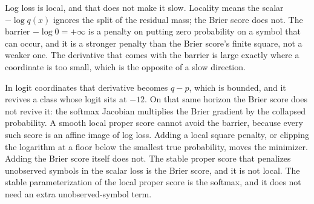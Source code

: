 \documentclass[10pt]{article}
\begin{document}
Log loss is local, and that does not make it slow.
Locality means the scalar $-\log q(x)$ ignores the split of the residual mass; the Brier score does not.
The barrier $-\log 0=+\infty$ is a penalty on putting zero probability on a symbol that can occur, and it is a stronger penalty than the Brier score's finite square, not a weaker one.
The derivative that comes with the barrier is large exactly where a coordinate is too small, which is the opposite of a slow direction.

In logit coordinates that derivative becomes $q-p$, which is bounded, and it revives a class whose logit sits at $-12$.
On that same horizon the Brier score does not revive it: the softmax Jacobian multiplies the Brier gradient by the collapsed probability.
A smooth local proper score cannot avoid the barrier, because every such score is an affine image of log loss.
Adding a local square penalty, or clipping the logarithm at a floor below the smallest true probability, moves the minimizer.
Adding the Brier score itself does not.
The stable proper score that penalizes unobserved symbols in the scalar loss is the Brier score, and it is not local.
The stable parameterization of the local proper score is the softmax, and it does not need an extra unobserved-symbol term.



\end{document}
